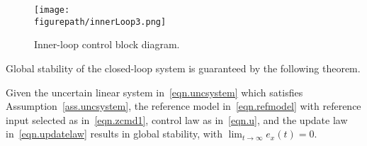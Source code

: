 \begin{figure}[H]
  \begin{center}
    \texttt{[image: \\figurepath/innerLoop3.png]}
    \vspace{-0.1in}
    \caption{Inner-loop control block diagram.\label{fig.innerLoop3}}
  \end{center}
\end{figure}

Global stability of the closed-loop system is guaranteed by the following theorem.

\begin{thm-dan}\label{thm.innerLoopStability}
  Given the uncertain linear system in\ \eqref{eqn.uncsystem} which satisfies Assumption~\ref{ass.uncsystem}, the reference model in\ \eqref{eqn.refmodel} with reference input selected as in\ \eqref{eqn.zcmd1}, control law as in\ \eqref{eqn.u}, and the update law in\ \eqref{eqn.updatelaw} results in global stability, with $\lim_{t\rightarrow\infty}e_{x}(t)=0$.
\end{thm-dan}

